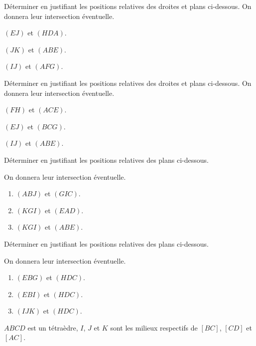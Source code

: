 \begin{colonne*exercice}
\begin{exercice}
  Déterminer en justifiant les positions relatives des droites et
  plans ci-dessous. On donnera leur intersection éventuelle.
  \begin{colenumerate}{2}
  \item $(EJ)$ et $(HDA)$.
  \item $(JK)$ et $(ABE)$.
  \item $(IJ)$ et $(AFG)$.
  \end{colenumerate}
\end{exercice}

\begin{exercice}
  Déterminer en justifiant les positions relatives des droites et
  plans ci-dessous. On donnera leur intersection éventuelle.
  \begin{colenumerate}{2}
  \item $(FH)$ et $(ACE)$.
  \item $(EJ)$ et $(BCG)$.
  \item $(IJ)$ et $(ABE)$.
  \end{colenumerate}
\end{exercice}

\columnbreak

\begin{exercice}
  Déterminer en justifiant les positions relatives des plans
  ci-dessous. 

  On donnera leur intersection éventuelle.
  \begin{enumerate}
  \item $(ABJ)$ et $(GIC)$.
  \item $(KGI)$ et $(EAD)$.
  \item $(KGI)$ et $(ABE)$.
  \end{enumerate}
\end{exercice}

\begin{exercice}\label{G2Exo17}
  Déterminer en justifiant les positions relatives des plans
  ci-dessous. 

  On donnera leur intersection éventuelle.
  \begin{enumerate}
  \item $(EBG)$ et $(HDC)$.
  \item $(EBI)$ et $(HDC)$.
  \item $(IJK)$ et $(HDC)$.
  \end{enumerate}
\end{exercice}

\begin{exercice}
  $ABCD$ est un tétraèdre, $I$, $J$ et $K$ sont les milieux respectifs
  de $[BC]$, $[CD]$ et $[AC]$.


\end{exercice}
\end{colonne*exercice}
